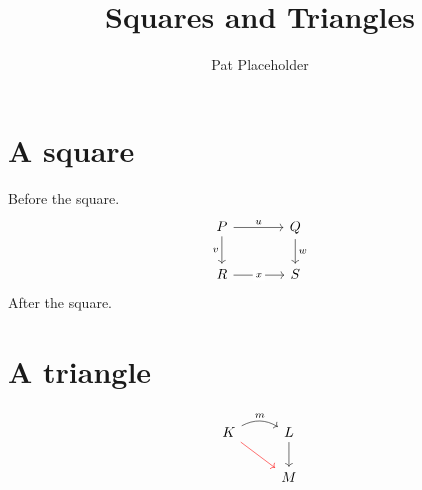 \documentclass{article}
\title{Squares and Triangles}
\author{Pat Placeholder}
\begin{document}
\maketitle

\section{A square}

Before the square.
\[
\begin{tikzcd}[column sep=large]
  P \arrow[r, "u"] \arrow[d, "v"'] & Q \arrow{d}{w} \\
  R \arrow[r, "x" description] & S
\end{tikzcd}
\]
After the square.

\section{A triangle}

\[
\begin{tikzcd}
  K \arrow[r, bend left, "m"] \arrow[dr, red] & L \arrow[d] \\
  & M
\end{tikzcd}
\]
\end{document}
